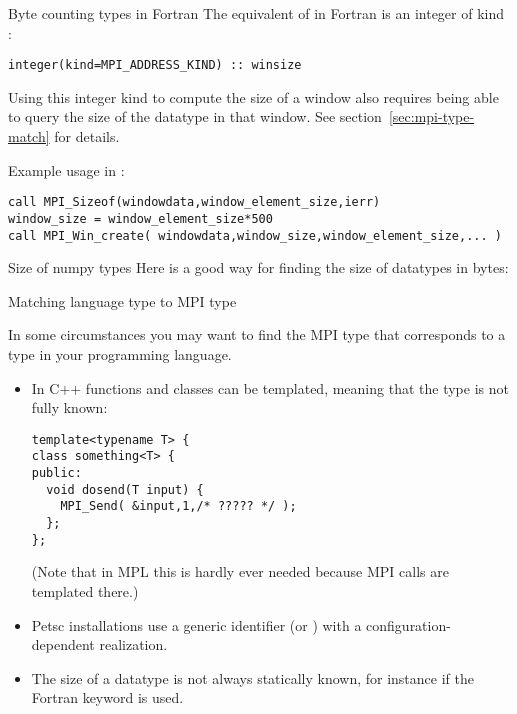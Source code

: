 \begin{fortrannote}{Byte counting types in Fortran}
The equivalent of
 in Fortran
is an integer of kind :
\lstset{style=reviewcode,language=Fortran} %
\begin{lstlisting}
integer(kind=MPI_ADDRESS_KIND) :: winsize
\end{lstlisting}
\lstset{style=reviewcode,language=C} %

Using this integer kind to compute the size of a window
also requires being able to query the size of the datatype
in that window.
See section~\ref{sec:mpi-type-match} for details.

Example usage in :
\lstset{language=Fortran} %
\begin{lstlisting}
call MPI_Sizeof(windowdata,window_element_size,ierr)
window_size = window_element_size*500
call MPI_Win_create( windowdata,window_size,window_element_size,... )
\end{lstlisting}
\lstset{language=C} %
\end{fortrannote}

\begin{pythonnote}{Size of numpy types}
  Here is a good way for finding the size of  datatypes
  in bytes:
\end{pythonnote}

 {Matching language type to MPI type}
\label{sec:mpi-type-match}

In some circumstances you may want to find the MPI type
that corresponds to a type in your programming language.
\begin{itemize}
\item In C++ functions and classes can be templated,
  meaning that the type is not fully known:
\begin{lstlisting}
template<typename T> {
class something<T> {
public:
  void dosend(T input) {
    MPI_Send( &input,1,/* ????? */ );
  };
};
\end{lstlisting}
(Note that in \ac{MPL} this is hardly ever needed
because MPI calls are templated there.)
\item Petsc installations use a generic identifier 
  (or )
  with a configuration-dependent realization.
\item The size of a datatype is not always statically known, for instance if
the Fortran  keyword is used.
\end{itemize}

